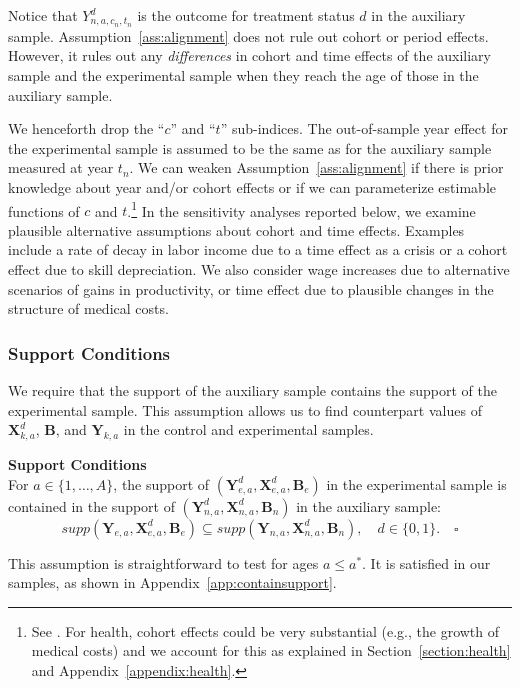 Notice that $Y^d_{n,a,{c_n},{t_n}}$ is the outcome for treatment status $d$ in the auxiliary sample. Assumption~\ref{ass:alignment} does not rule out cohort or period effects. However, it rules out any \emph{differences} in cohort and time effects of the auxiliary sample and the experimental sample when they reach the age of those in the auxiliary sample.

We henceforth drop the ``$c$'' and ``$t$'' sub-indices. The out-of-sample year effect for the experimental sample is assumed to be the same as for the auxiliary sample measured at year $t_n$. We can weaken Assumption~\ref{ass:alignment} if there is prior knowledge about year and/or cohort effects or if we can parameterize estimable functions of $c$ and $t$.\footnote{See \cite{Heckman_Robb_1985_JE}. For health, cohort effects could be very substantial (e.g., the growth of medical costs) and we account for this as explained in Section~\ref{section:health} and  Appendix~\ref{appendix:health}.} In the sensitivity analyses reported below, we examine plausible alternative assumptions about cohort and time effects. Examples include a rate of decay in labor income due to a time effect as a crisis or a cohort effect due to skill depreciation. We also consider wage increases due to alternative scenarios of gains in productivity, or time effect due to plausible changes in the structure of medical costs.

\subsubsection{Support Conditions}

We require that the support of the auxiliary sample contains the support of the experimental sample. This assumption allows us to find counterpart values of $\bm{X}^d_{k,a}$, $\bm{B}$, and $\bm{Y}_{k,a}$ in the control and experimental samples.

\onehalfspacing
\begin{assumption} \label{ass:contain} \textbf{Support Conditions} \\
For $a \in \{ 1, \ldots, A \}$, the support of $\left( \bm{Y}^d_{e,a}, \bm{X}^d_{e,a}, \bm{B}_e \right)$ in the experimental sample is contained in the support of $\left( \bm{Y}^d_{n,a}, \bm{X}^d_{n,a}, \bm{B}_n \right)$ in the auxiliary sample:
\begin{equation}
supp( \bm{Y}_{e,a}, \bm{X}^d_{e,a}, \bm{B}_e ) \subseteq supp( \bm{Y}_{n,a}, \bm{X}^d_{n,a}, \bm{B}_n ), \quad d \in \{0,1\}. \quad \square
\end{equation}
\end{assumption}
\doublespacing
This assumption is straightforward to test for ages $a\leq a^\ast$. It is satisfied in our samples, as shown in Appendix~\ref{app:containsupport}.

